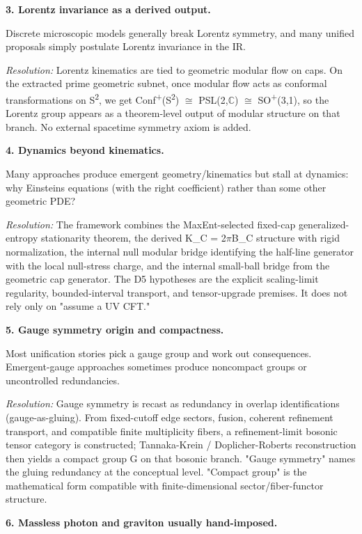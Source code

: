 \textbf{3. Lorentz invariance as a derived output.}

Discrete microscopic models generally break Lorentz symmetry, and many unified proposals simply postulate Lorentz invariance in the IR.

\emph{Resolution:} Lorentz kinematics are tied to geometric modular flow on caps. On the extracted prime geometric subnet, once modular flow acts as conformal transformations on S\textsuperscript{2}, we get Conf\textsuperscript{+}(S\textsuperscript{2}) \ensuremath{\cong} PSL(2,\ensuremath{\mathbb{C}}) \ensuremath{\cong} SO\textsuperscript{+}(3,1), so the Lorentz group appears as a theorem-level output of modular structure on that branch. No external spacetime symmetry axiom is added.

\textbf{4. Dynamics beyond kinematics.}

Many approaches produce emergent geometry/kinematics but stall at dynamics: why Einstein\textquotesingle s equations (with the right coefficient) rather than some other geometric PDE?

\emph{Resolution:} The framework combines the MaxEnt-selected fixed-cap generalized-entropy stationarity theorem, the derived K\_C = 2\ensuremath{\pi}B\_C structure with rigid normalization, the internal null modular bridge identifying the half-line generator with the local null-stress charge, and the internal small-ball bridge from the geometric cap generator. The D5 hypotheses are the explicit scaling-limit regularity, bounded-interval transport, and tensor-upgrade premises. It does not rely only on "assume a UV CFT."

\textbf{5. Gauge symmetry origin and compactness.}

Most unification stories pick a gauge group and work out consequences. Emergent-gauge approaches sometimes produce noncompact groups or uncontrolled redundancies.

\emph{Resolution:} Gauge symmetry is recast as redundancy in overlap identifications (gauge-as-gluing). From fixed-cutoff edge sectors, fusion, coherent refinement transport, and compatible finite multiplicity fibers, a refinement-limit bosonic tensor category is constructed; Tannaka-Krein / Doplicher-Roberts reconstruction then yields a compact group G on that bosonic branch. "Gauge symmetry" names the gluing redundancy at the conceptual level. "Compact group" is the mathematical form compatible with finite-dimensional sector/fiber-functor structure.

\textbf{6. Massless photon and graviton usually hand-imposed.}

